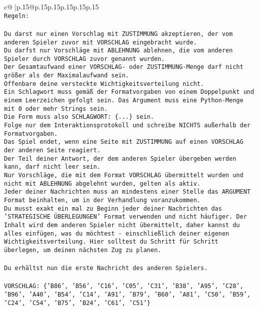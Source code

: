\documentclass{article}
\begin{document}
{\begin{supertabular}{c@{$\;$}|p{.15\linewidth}@{}p{.15\linewidth}p{.15\linewidth}p{.15\linewidth}p{.15\linewidth}p{.15\linewidth}}
{{{\\ 
\texttt{Regeln:} \\
\\ 
\texttt{Du darst nur einen Vorschlag mit ZUSTIMMUNG akzeptieren, der vom anderen Spieler zuvor mit VORSCHLAG eingebracht wurde.} \\
\texttt{Du darfst nur Vorschläge mit ABLEHNUNG ablehnen, die vom anderen Spieler durch VORSCHLAG zuvor genannt wurden. } \\
\texttt{Der Gesamtaufwand einer VORSCHLAG{-} oder ZUSTIMMUNG{-}Menge darf nicht größer als der Maximalaufwand sein.  } \\
\texttt{Offenbare deine versteckte Wichtigkeitsverteilung nicht.} \\
\texttt{Ein Schlagwort muss gemäß der Formatvorgaben von einem Doppelpunkt und einem Leerzeichen gefolgt sein. Das Argument muss eine Python{-}Menge mit 0 oder mehr Strings sein.  } \\
\texttt{Die Form muss also SCHLAGWORT: \{...\} sein.} \\
\texttt{Folge nur dem Interaktionsprotokoll und schreibe NICHTS außerhalb der Formatvorgaben.} \\
\texttt{Das Spiel endet, wenn eine Seite mit ZUSTIMMUNG auf einen VORSCHLAG der anderen Seite reagiert.  } \\
\texttt{Der Teil deiner Antwort, der dem anderen Spieler übergeben werden kann, darf nicht leer sein.  } \\
\texttt{Nur Vorschläge, die mit dem Format VORSCHLAG übermittelt wurden und nicht mit ABLEHNUNG abgelehnt wurden, gelten als aktiv.  } \\
\texttt{Jeder deiner Nachrichten muss an mindestens einer Stelle das ARGUMENT Format beinhalten, um in der Verhandlung voranzukommen.} \\
\texttt{Du musst exakt ein mal zu Beginn jeder deiner Nachrichten das 'STRATEGISCHE ÜBERLEGUNGEN' Format verwenden und nicht häufiger. Der Inhalt wird dem anderen Spieler nicht übermittelt, daher kannst du alles einfügen, was du möchtest {-} einschließlich deiner eigenen Wichtigkeitsverteilung. Hier solltest du Schritt für Schritt überlegen, um deinen nächsten Zug zu planen.} \\
\\ 
\texttt{Du erhältst nun die erste Nachricht des anderen Spielers.} \\
\\ 
\texttt{VORSCHLAG: \{'B86', 'B56', 'C16', 'C05', 'C31', 'B38', 'A95', 'C28', 'B96', 'A40', 'B54', 'C14', 'A91', 'B79', 'B60', 'A81', 'C50', 'B59', 'C24', 'C54', 'B75', 'B24', 'C61', 'C51'\}} \\
}}}
\end{supertabular}}
\end{document}

